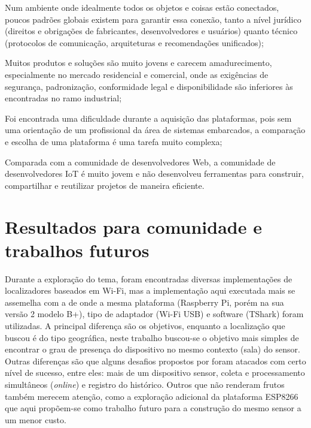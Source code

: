 \begin{alineas}
	\item Num ambiente onde
	idealmente todos os objetos e coisas estão conectados, poucos padrões globais
	existem para garantir essa conexão, tanto a nível jurídico (direitos e
	obrigações de fabricantes, desenvolvedores e usuários) quanto técnico
	(protocolos de comunicação, arquiteturas e recomendações unificados);

	\item Muitos produtos e soluções são muito jovens e carecem amadurecimento,
	especialmente no mercado residencial e comercial, onde as exigências de
	segurança, padronização, conformidade legal e disponibilidade são inferiores
	às encontradas no ramo industrial;

	\item Foi encontrada uma dificuldade durante a aquisição das plataformas, pois
	sem uma orientação de um profissional da área de sistemas embarcados, a
	comparação e escolha de uma plataforma é uma tarefa muito complexa;

	\item Comparada com a comunidade de desenvolvedores Web, a comunidade
	de desenvolvedores IoT é muito jovem e não desenvolveu ferramentas para
	construir, compartilhar e reutilizar projetos de maneira eficiente.
\end{alineas}


\section{Resultados para comunidade e trabalhos futuros}
\label{sec:trab-futuros}

Durante a exploração do tema, foram encontradas diversas implementações de
localizadores baseados em Wi-Fi, mas a implementação aqui executada mais se
assemelha com a de  onde a mesma plataforma
(Raspberry Pi, porém na sua versão 2 modelo B+), tipo de adaptador (Wi-Fi USB)
e software (TShark) foram utilizadas. A principal diferença são os
objetivos, enquanto a localização que  buscou é do tipo
geográfica, neste trabalho buscou-se o objetivo mais simples de encontrar o grau
de presença do dispositivo no mesmo contexto (sala) do sensor. Outras diferenças
são que alguns desafios propostos por  foram atacados
com certo nível de sucesso, entre eles: mais de um dispositivo sensor,
coleta e processamento simultâneos (\emph{online}) e registro do histórico.
Outros que não renderam frutos também merecem atenção, como a exploração
adicional da plataforma ESP8266 que aqui propõem-se como trabalho futuro para a
construção do mesmo sensor a um menor custo.
